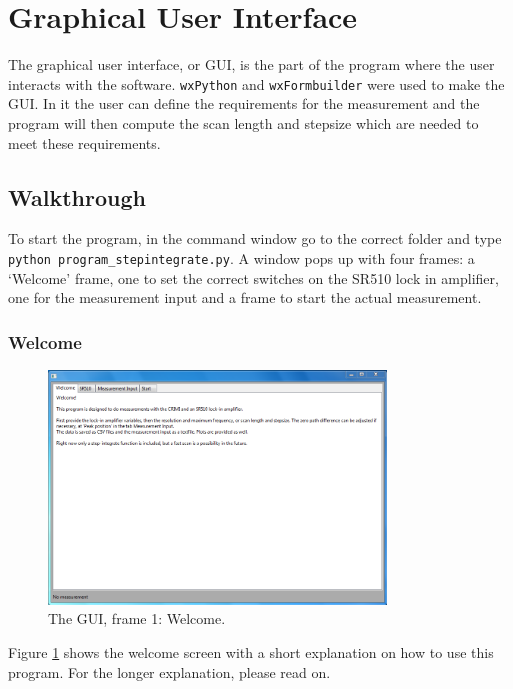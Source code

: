 
\section{Graphical User Interface}
The graphical user interface, or GUI, is the part of the program where the user interacts with the software. \verb!wxPython! and \verb!wxFormbuilder! were used to make the GUI. In it the user can define the requirements for the measurement and the program will then compute the scan length and stepsize which are needed to meet these requirements.

\subsection{Walkthrough}

To start the program, in the command window go to the correct folder and type \verb!python program_stepintegrate.py!. A window pops up with four frames: a `Welcome' frame, one to set the correct switches on the SR510 lock in amplifier, one for the measurement input and a frame to start the actual measurement.

\subsubsection{Welcome}

\begin{figure}[!ht]
 \begin{center}
  \includegraphics[width=0.8\textwidth]{figures/gui1}
  \caption{The GUI, frame 1: Welcome.}
  \label{fig:gui1}
 \end{center}
\end{figure}

Figure \ref{fig:gui1} shows the welcome screen with a short explanation on how to use this program. For the longer explanation, please read on.

